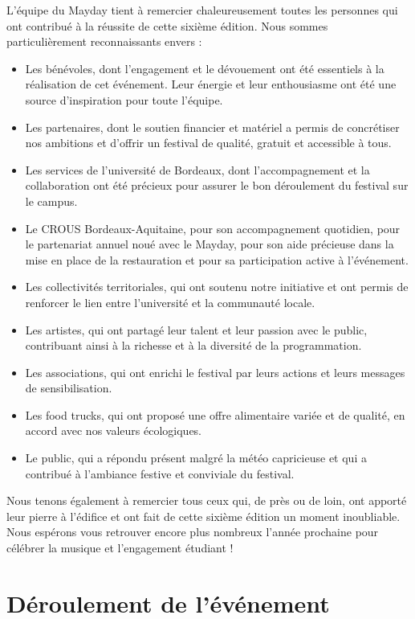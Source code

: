 \documentclass[12pt,a4paper]{report}
\begin{document}
L’équipe du Mayday tient à remercier chaleureusement toutes les personnes qui ont contribué à la réussite de cette sixième édition. Nous sommes particulièrement reconnaissants envers :
\begin{itemize}
\item Les bénévoles, dont l’engagement et le dévouement ont été essentiels à la réalisation de cet événement. Leur énergie et leur enthousiasme ont été une source d’inspiration pour toute l’équipe.
\item Les partenaires, dont le soutien financier et matériel a permis de concrétiser nos ambitions et d’offrir un festival de qualité, gratuit et accessible à tous.
\item Les services de l’université de Bordeaux, dont l’accompagnement et la collaboration ont été précieux pour assurer le bon déroulement du festival sur le campus.
\item Le CROUS Bordeaux-Aquitaine, pour son accompagnement quotidien, pour le partenariat annuel noué avec le Mayday, pour son aide précieuse dans la mise en place de la restauration et pour sa participation active à l’événement.
\item Les collectivités territoriales, qui ont soutenu notre initiative et ont permis de renforcer le lien entre l’université et la communauté locale.
\item Les artistes, qui ont partagé leur talent et leur passion avec le public, contribuant ainsi à la richesse et à la diversité de la programmation.
\item Les associations, qui ont enrichi le festival par leurs actions et leurs messages de sensibilisation.
\item Les food trucks, qui ont proposé une offre alimentaire variée et de qualité, en accord avec nos valeurs écologiques.
\item Le public, qui a répondu présent malgré la météo capricieuse et qui a contribué à l’ambiance festive et conviviale du festival.
\end{itemize}
Nous tenons également à remercier tous ceux qui, de près ou de loin, ont apporté leur pierre à l’édifice et ont fait de cette sixième édition un moment inoubliable. Nous espérons vous retrouver encore plus nombreux l’année prochaine pour célébrer la musique et l’engagement étudiant !

\chapter{Déroulement de l'événement}
\end{document}
